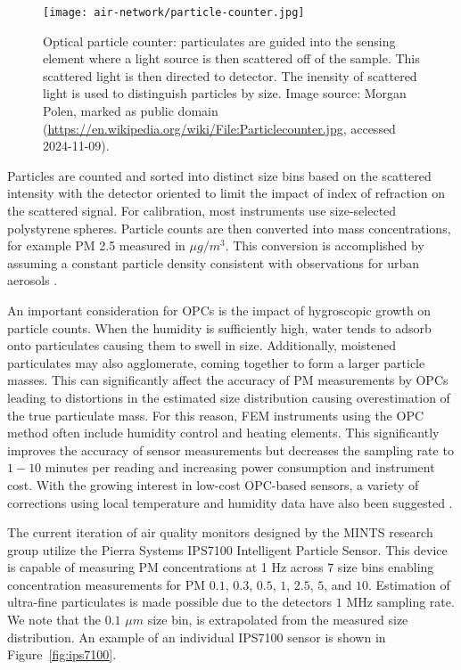 \begin{figure}[h]
  \centering
  \texttt{[image: air-network/particle-counter.jpg]}
  \caption{Optical particle counter: particulates are guided into the sensing
    element where a light source is then scattered off of the sample. This scattered
  light is then directed to detector. The inensity of scattered light is used to
distinguish particles by size. Image source: Morgan Polen, marked as public domain
(\url{https://en.wikipedia.org/wiki/File:Particlecounter.jpg}, accessed 2024-11-09). }
  \label{fig:opc-diagram}
\end{figure}

Particles are counted and sorted into distinct size bins based on the scattered
intensity with the detector oriented to limit the impact of index
of refraction on the scattered signal. For calibration,
most instruments use size-selected polystyrene spheres. Particle counts are then
converted into mass concentrations, for example PM 2.5 measured in $\mu g/m^3$.
This conversion is accomplished by assuming a constant particle density
consistent with observations for urban aerosols \cite{pm-density}.

An important consideration for OPCs is the impact of hygroscopic growth on
particle counts. When the humidity is sufficiently high, water tends to adsorb
onto particulates causing them to swell in size. Additionally, moistened
particulates may also agglomerate, coming together to form a larger particle
masses. This can significantly affect the accuracy of PM measurements by OPCs
leading to distortions in the estimated size distribution causing overestimation
of the true particulate mass. For this reason, FEM instruments using the OPC method
often include humidity control and heating elements. This significantly improves
the accuracy of sensor measurements but decreases the sampling rate to $1-10$
minutes per reading and increasing power consumption and instrument cost.
With the growing interest in low-cost OPC-based sensors, a variety of
corrections using local temperature and humidity data have also been suggested
\cite{opc-corrections}.

The current iteration of air quality monitors designed by the MINTS research
group utilize the Pierra Systems IPS7100 Intelligent Particle Sensor. This
device is capable of measuring PM concentrations at 1 Hz across 7 size bins
enabling concentration measurements for PM $0.1$, $0.3$, $0.5$, $1$, $2.5$, $5$,
and $10$. Estimation of ultra-fine particulates is made possible due to the
detectors $1$ MHz sampling rate. We note that the $0.1$ $\mu m$ size bin, is
extrapolated from the measured size distribution. An example of an individual
IPS7100 sensor is shown in Figure~\ref{fig:ips7100}.

